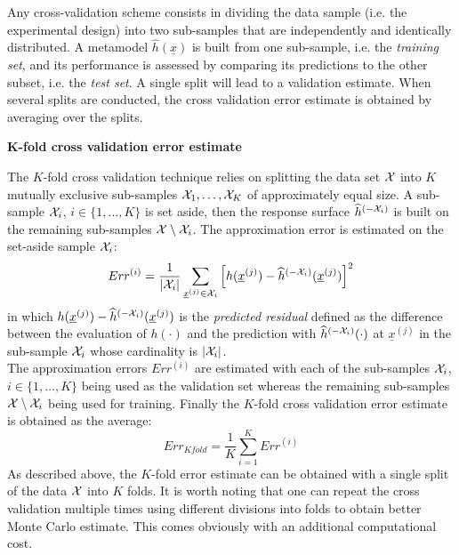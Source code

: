 {    Any cross-validation scheme consists in dividing the data sample (i.e. the experimental design) into two sub-samples that are independently and identically distributed. A metamodel $\widehat{h}(\underline{x})$ is built from one sub-sample, i.e. the \emph{training set}, and its performance is assessed by comparing its predictions to the other subset, i.e. the \emph{test set}. A single split will lead to a validation estimate. When several splits are conducted, the cross validation error estimate is obtained by averaging over the splits.
    
    \textbf{K-fold cross validation error estimate} \vspace{2mm}
    
    The $K$-fold cross validation technique relies on splitting the data set ${\mathcal X}$ into $K$ mutually exclusive sub-samples ${\mathcal X}_1, \dots, {\mathcal X}_K$ of approximately equal size. A sub-sample ${\mathcal X}_i$, $i \in \{ 1, \dots, K\} $ is set aside, then the response surface $\widehat{h}^{(-{\mathcal X}_i)}$ is built on the remaining sub-samples ${\mathcal X} \setminus {\mathcal X}_i$. The approximation error is estimated on the set-aside sample ${\mathcal X}_i$:
    \begin{equation}
      Err^{(i)}  = \dfrac{1}{ |{\mathcal X}_i|}  \sum\limits_{\underline{x}^{(j)} \in {\mathcal X}_i} \left[ h(\underline{x}^{(j)}) - \widehat{h}^{(-{\mathcal X}_i)} {(\underline{x}^{(j)})} \right]^2
    \end{equation}
    in which $h(\underline{x}^{(j)}) - \widehat{h}^{(-{\mathcal X}_i)} {(\underline{x}^{(j)})}$ is the \emph{predicted residual} defined as the difference between the evaluation of $h(\cdot)$ and the prediction with $\widehat{h}^{(-{\mathcal X}_i)}(\cdot)$ at $\underline{x}^{(j)}$ in the sub-sample ${\mathcal X}_i$ whose cardinality is $|{\mathcal X}_i|$.\\
    The approximation errors $Err^{(i)}$ are estimated with each of the sub-samples ${\mathcal X}_i$, $i \in \{ 1, \dots, K\} $ being used as the validation set whereas the remaining sub-samples ${\mathcal X} \setminus {\mathcal X}_i$ being used for training. Finally the $K$-fold cross validation error estimate is obtained as the average:
    \begin{equation}
	    Err_{Kfold} = \dfrac{1}{K} \sum\limits_{i=1}^{K} Err^{(i)}
    \end{equation}
    As described above, the $K$-fold error estimate can be obtained with a single split of the data ${\mathcal X}$ into $K$ folds. It is worth noting that one can repeat the cross validation multiple times using different divisions into folds to obtain better Monte Carlo estimate. This comes obviously with an additional computational cost.
  
}
